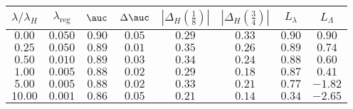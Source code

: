 \begin{tabular}{cccccccc} 
\toprule 
$\lambda / \lambda_H$ & $\lambda_\text{reg}$ & $\auc$ & $\Delta \auc$ 
& $|\Delta_H(\frac{1}{8})|$ & $|\Delta_H(\frac{3}{4})|$ & $L_\lambda$ & $L_\Lambda$ \\ 
\midrule 
$0.00$ & $0.050$ & $0.90$ & $0.05$ & $0.29$ & $0.33$ & $0.90$ & $0.90$ \\ 
$0.25$ & $0.050$ & $0.89$ & $0.01$ & $0.35$ & $0.26$ & $0.89$ & $0.74$ \\ 
$0.50$ & $0.010$ & $0.89$ & $0.03$ & $0.34$ & $0.24$ & $0.88$ & $0.60$ \\ 
$1.00$ & $0.005$ & $0.88$ & $0.02$ & $0.29$ & $0.18$ & $0.87$ & $0.41$ \\ 
$5.00$ & $0.005$ & $0.88$ & $0.02$ & $0.33$ & $0.21$ & $0.77$ & $-1.82$ \\ 
$10.00$ & $0.001$ & $0.86$ & $0.05$ & $0.21$ & $0.14$ & $0.34$ & $-2.65$ \\ 
\bottomrule 
\end{tabular} 
